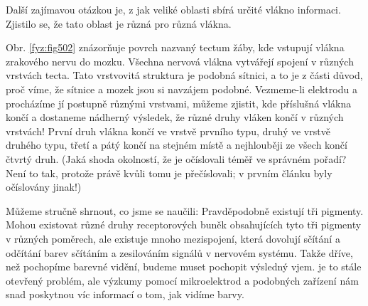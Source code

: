     Další zajímavou otázkou je, z jak veliké oblasti sbírá určité vlákno informaci. Zjistilo se, že
    tato oblast je různá pro různá vlákna.
    
    Obr. \ref{fyz:fig502} znázorňuje povrch nazvaný tectum žáby, kde vstupují vlákna zrakového nervu
    do mozku. Všechna nervová vlákna vytvářejí spojení v různých vrstvách tecta. Tato vrstvovitá
    struktura je podobná sítnici, a to je z části důvod, proč víme, že sítnice a mozek jsou si
    navzájem podobné. Vezmeme-li elektrodu a procházíme jí postupně různými vrstvami, můžeme
    zjistit, kde příslušná vlákna končí a dostaneme nádherný výsledek, že různé druhy vláken končí v
    různých vrstvách! První druh vlákna končí ve vrstvě prvního typu, druhý ve vrstvě druhého typu,
    třetí a pátý končí na stejném místě a nejhlouběji ze všech končí čtvrtý druh. (Jaká shoda
    okolností, že je očíslovali téměř ve správném pořadí? Není to tak, protože právě kvůli tomu je
    přečíslovali; v prvním článku byly očíslovány jinak!)
    
    Můžeme stručně shrnout, co jsme se naučili: Pravděpodobně existují tři pigmenty. Mohou existovat
    různé druhy receptorových buněk obsahujících tyto tři pigmenty v různých poměrech, ale existuje
    mnoho mezispojení, která dovolují sčítání a odčítání barev sčítáním a zesilováním signálů v
    nervovém systému. Takže dříve, než pochopíme barevné vidění, budeme muset pochopit výsledný
    vjem. je to stále otevřený problém, ale výzkumy pomocí mikroelektrod a podobných zařízení nám
    snad poskytnou víc informací o tom, jak vidíme barvy.

